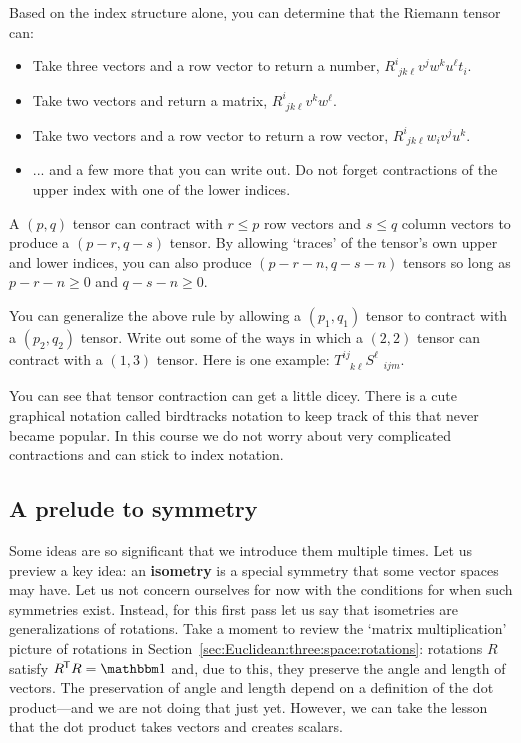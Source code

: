 \documentclass[12pt, oneside]{report}    %
\begin{document}
Based on the index structure alone, you can determine that the Riemann tensor can:
\begin{itemize}
    \item Take three vectors and a row vector to return a number, $R^i_{\phantom{i}jk\ell} v^jw^ku^\ell t_i$.
    \item Take two vectors and return a matrix, $R^i_{\phantom{i}jk\ell}v^kw^\ell$. 
    \item Take two vectors and a row vector to return a row vector, $R^i_{\phantom{i}jk\ell}w_iv^ju^k$.
    \item ... and a few more that you can write out. Do not forget contractions of the upper index with one of the lower indices.
\end{itemize}
\begin{newrule}
A $(p,q)$ tensor can contract with $r\leq p$ row vectors and $s \leq q$ column vectors to produce a $(p-r, q-s)$ tensor. By allowing `traces' of the tensor's own upper and lower indices, you can also produce $(p-r-n, q-s-n)$ tensors so long as $p-r-n\geq 0$ and $q-s-n\geq 0$.
\end{newrule}
\begin{exercise}
You can generalize the above rule by allowing a $(p_1,q_1)$ tensor to contract with a $(p_2, q_2)$ tensor. Write out some of the ways in which a $(2,2)$ tensor can contract with a $(1,3)$ tensor. Here is one example: $T^{ij}_{\phantom{ij}k\ell} S^\ell_{\phantom{\ell}ijm}$. 
\end{exercise}
You can see that tensor contraction can get a little dicey. There is a cute graphical notation called birdtracks notation to keep track of this that never became popular. In this course we do not worry about very complicated contractions and can stick to index notation.


\subsection{A prelude to symmetry}
\label{sec:isometry:first:pass:indices}
Some ideas are so significant that we introduce them multiple times. Let us preview a key idea: an \textbf{isometry} is a special symmetry that some vector spaces may have. Let us not concern ourselves for now with the conditions for when such symmetries exist. Instead, for this first pass let us say that isometries are generalizations of rotations.  Take a moment to review the `matrix multiplication' picture of rotations in Section~\ref{sec:Euclidean:three:space:rotations}: rotations $R$ satisfy $R^\trans R = \one$ and, due to this, they preserve the angle and length of vectors. The preservation of angle and length depend on a definition of the dot product---and we are not doing that just yet. However, we can take the lesson that the dot product takes vectors and creates scalars.
\end{document}
